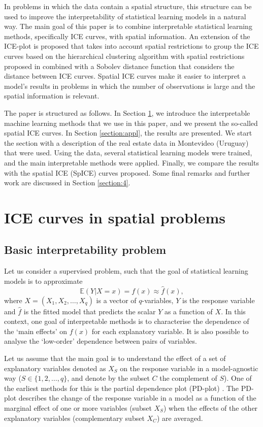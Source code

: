 \documentclass[smallextended,natbib]{svjour3}\usepackage[]{graphicx}\usepackage[]{xcolor}
\begin{document}
In problems in which the data contain a spatial structure, this structure can be used to improve the interpretability of statistical learning models in a natural way. The main goal of this paper is to combine interpretable statistical learning methods, specifically ICE curves, with spatial information. An extension of the ICE-plot is proposed that takes into account spatial restrictions to group the ICE curves based on the hierarchical clustering algorithm with spatial restrictions proposed in \cite{chavent2018} combined with a Sobolev distance function that considers the distance between ICE curves. Spatial ICE curves make it easier to interpret a model's results in problems in which the number of observations is large and the spatial information is relevant.

The paper is structured as follows. In  Section \ref{section:2}, we introduce the interpretable machine learning methods that we use in this paper, and we present the so-called spatial ICE curves. In Section \ref{section:appl}, the results are presented. We start the section with a description of the real estate data in Montevideo (Uruguay) that were used. Using the data, several statistical learning models were trained, and the main interpretable methods were applied. Finally, we compare the results with the spatial ICE (SpICE) curves proposed. Some final remarks and further work are discussed in Section \ref{section:4}.

\section{ICE curves in spatial problems} \label{section:2}

\subsection{Basic interpretability problem}
Let us consider a supervised problem, such that the goal of statistical learning models is to approximate 
\[
\mathbb{E}(Y|X=x) = f(x) \approx \hat f(x),
\]
where $X=(X_1,X_2,\dots, X_q)$ is a vector of $q$-variables, $Y$ is the response variable and $\hat f$ is the fitted model that predicts the scalar $Y$ as a function of $X$. In this context, one goal of interpretable methods is to characterise the dependence of the `main effects' on $f(x)$ for each explanatory variable. It is also possible to analyse the `low-order' dependence between pairs of variables. 

Let us assume that the main goal is to understand the effect of a set of explanatory variables denoted as $X_S$ on the response variable in a model-agnostic way ($S \in \{1,2,\dots,q\}$, and denote by the subset $C$ the complement of $S$). One of the earliest methods for this is the partial dependence plot (PD-plot) \citep{friedman2001}. The PD-plot describes the change of the response variable in a model as a function of the marginal effect of one or more variables (subset $X_S$) when the effects of the other explanatory variables (complementary subset $X_C$) are averaged. 
\end{document}
